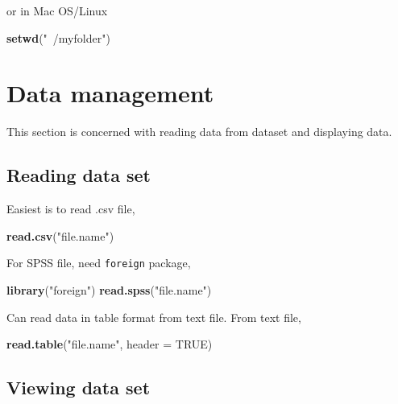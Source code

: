 \documentclass[]{book}
\newenvironment{Shaded}{\begin{snugshade}}{\end{snugshade}}
\newcommand{\KeywordTok}[1]{\textcolor[rgb]{0.13,0.29,0.53}{\textbf{{#1}}}}
\newcommand{\DataTypeTok}[1]{\textcolor[rgb]{0.13,0.29,0.53}{{#1}}}
\newcommand{\StringTok}[1]{\textcolor[rgb]{0.31,0.60,0.02}{{#1}}}
\newcommand{\OtherTok}[1]{\textcolor[rgb]{0.56,0.35,0.01}{{#1}}}
\newcommand{\NormalTok}[1]{{#1}}
\theoremstyle{definition}
\theoremstyle{definition}
\theoremstyle{remark}
\begin{document}
or in Mac OS/Linux

\begin{Shaded}
\begin{Highlighting}[]
\KeywordTok{setwd}\NormalTok{(}\StringTok{"~/myfolder"}\NormalTok{)}
\end{Highlighting}
\end{Shaded}

\section{Data management}\label{data-management}

This section is concerned with reading data from dataset and displaying
data.

\subsection{Reading data set}\label{reading-data-set}

Easiest is to read .csv file,

\begin{Shaded}
\begin{Highlighting}[]
\KeywordTok{read.csv}\NormalTok{(}\StringTok{"file.name"}\NormalTok{)}
\end{Highlighting}
\end{Shaded}

For SPSS file, need \texttt{foreign} package,

\begin{Shaded}
\begin{Highlighting}[]
\KeywordTok{library}\NormalTok{(}\StringTok{"foreign"}\NormalTok{)}
\KeywordTok{read.spss}\NormalTok{(}\StringTok{"file.name"}\NormalTok{)}
\end{Highlighting}
\end{Shaded}

Can read data in table format from text file. From text file,

\begin{Shaded}
\begin{Highlighting}[]
\KeywordTok{read.table}\NormalTok{(}\StringTok{"file.name"}\NormalTok{, }\DataTypeTok{header =} \OtherTok{TRUE}\NormalTok{)}
\end{Highlighting}
\end{Shaded}

\subsection{Viewing data set}\label{viewing-data-set}
\end{document}

